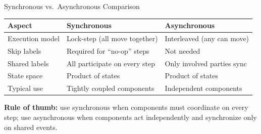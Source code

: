 \begin{frame}{Synchronous vs.\ Asynchronous Comparison}

\begin{center}
\begin{tabular}{@{}lll@{}}
  \toprule
  \textbf{Aspect} & \textbf{Synchronous} & \textbf{Asynchronous} \\
  \midrule
  Execution model  & Lock-step (all move together) & Interleaved (any can move) \\
  Skip labels      & Required for ``no-op'' steps  & Not needed \\
  Shared labels    & All participate on every step  & Only involved parties sync \\
  State space      & Product of states              & Product of states \\
  Typical use      & Tightly coupled components     & Independent components \\
  \bottomrule
\end{tabular}
\end{center}

\vspace{1em}
\textbf{Rule of thumb:} use \alert{synchronous} when components must coordinate on every step;
use \alert{asynchronous} when components act independently and synchronize only on shared events.

\end{frame}


